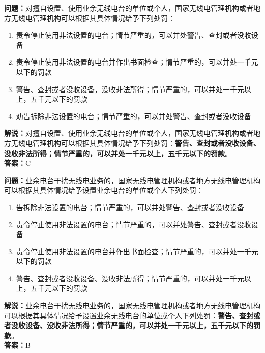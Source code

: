 \documentclass{ctexbook}
\begin{document}
\noindent\textbf{问题：}对擅自设置、使用业余无线电台的单位或个人，国家无线电管理机构或者地方无线电管理机构可以根据其具体情况给予下列处罚：
\begin{enumerate}[label=\Alph*), leftmargin=3em]
	\item  责令停止使用非法设置的电台；情节严重的，可以并处警告、查封或者没收设备
	\item  责令停止使用非法设置的电台并作出书面检查；情节严重的，可以并处一千元以下的罚款
	\item  警告、查封或者没收设备，没收非法所得；情节严重的，可以并处一千元以上，五千元以下的罚款
	\item  劝告拆除非法设置的电台；情节严重的，可以并处警告、查封或者没收设备
\end{enumerate}
\noindent\textbf{解说：}对擅自设置、使用业余无线电台的单位或个人，国家无线电管理机构或者地方无线电管理机构可以根据其具体情况给予下列处罚：\textbf{警告、查封或者没收设备、没收非法所得；情节严重的，可以并处一千元以上，五千元以下的罚款}。\\\textbf{答案：}C



\bigskip


\noindent\textbf{问题：}业余电台干扰无线电业务的，国家无线电管理机构或者地方无线电管理机构可以根据其具体情况给予设置业余电台的单位或个人下列处罚：
\begin{enumerate}[label=\Alph*), leftmargin=3em]
	\item  告拆除非法设置的电台；情节严重的，可以并处警告、查封或者没收设备
	\item  责令停止使用非法设置的电台；情节严重的，可以并处警告、查封或者没收设备
	\item  责令停止使用非法设置的电台并作出书面检查；情节严重的，可以并处一千元以下的罚款
	\item  警告、查封或者没收设备、没收非法所得；情节严重的，可以并处一千元以上，五千元以下的罚款
\end{enumerate}
\noindent\textbf{解说：}业余电台干扰无线电业务的，国家无线电管理机构或者地方无线电管理机构可以根据其具体情况给予设置业余无线电台的单位或个人下列处罚：\textbf{警告、查封或者没收设备、没收非法所得；情节严重的，可以并处一千元以上，五千元以下的罚款}。\\\noindent\textbf{答案：}B


\bigskip
\end{document}
